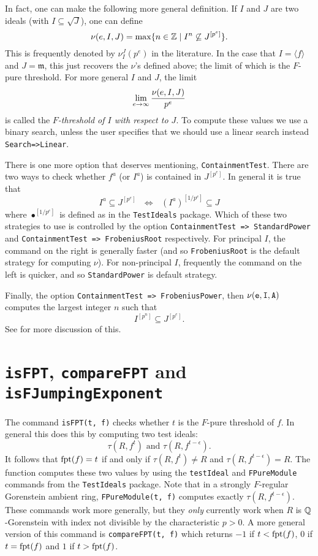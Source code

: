 \documentclass{amsart}
\newcommand{\fram}{\mathfrak{m}}
\begin{document}
In fact, one can make the following more general definition.  If $I$ and $J$ are two ideals (with $I \subseteq \sqrt{J}$), one can define
\[
\nu(e, I, J) = \max \{ n \in \mathbb{Z} \; |\; I^n \not\subseteq J^{[p^e]} \}.
\]
This is frequently denoted by $\nu_I^J(p^e)$ in the literature.  In the case that $I = \langle f \rangle$ and $J = \fram$, this just recovers the $\nu$'s defined above; the limit of which is the $F$-pure threshold.  For more general $I$ and $J$, the limit
\[
\lim_{e \to \infty} {\nu(e, I, J) \over p^e}
\]
is called the \emph{$F$-threshold of $I$ with respect to $J$}.  To compute these values we use a binary search, unless the user specifies that we should use a linear search instead {\tt Search=>Linear}.  

There is one more option that deserves mentioning, {\tt ContainmentTest}.  There are two ways to check whether $f^a$ (or $I^a$) is contained in $J^{[p^e]}$.  In general it is true that
\[
I^a \subseteq J^{[p^e]} \text{ $\Leftrightarrow$ } (I^a)^{[1/p^e]} \subseteq J
\]
where $\bullet^{[1/p^e]}$ is defined as in the {\tt TestIdeals} package.  Which of these two strategies to use is controlled by the option {\tt ContainmentTest => StandardPower} and {\tt ContainmentTest => FrobeniusRoot} respectively.
For principal $I$, the command on the right is generally faster (and so {\tt FrobeniusRoot} is the default strategy for computing $\nu$).  For non-principal $I$, frequently the command on the left is quicker, and so {\tt StandardPower} is default strategy. 

Finally, the option {\tt ContainmentTest => FrobeniusPower}, then ${\tt \nu(e, I, A)}$ computes the largest integer $n$ such that
\[
I^{[p^n]} \subseteq J^{[p^e]}.
\]
See \cite{HernandezTeixeiraWittFrobeniusPowers} for more discussion of this.  

\section{{\tt isFPT}, {\tt compareFPT} and {\tt isFJumpingExponent}}
\label{sec.IsFPT}

The command {\tt isFPT(t, f)} checks whether $t$ is the $F$-pure threshold of $f$.  In general this does this by computing two test ideals:
\[
\tau(R, f^t) \text{ and } \tau(R, f^{t-\epsilon}).
\]
It follows that $\operatorname{{fpt}}(f) = t$ if and only if $\tau(R, f^t) \neq R$ and $\tau(R, f^{t-\epsilon}) = R$.  The function computes these two values by using the {\tt testIdeal} and {\tt FPureModule} commands from the {\tt TestIdeals} package.  Note that in a strongly $F$-regular Gorenstein ambient ring, {\tt FPureModule(t, f)} computes exactly $\tau(R, f^{t-\epsilon})$.  These commands work more generally, but they \emph{only} currently work when $R$ is $\mathbb{Q}$-Gorenstein with index not divisible by the characteristic $p > 0$.  A more general version of this command is {\tt compareFPT(t, f)} which returns $-1$ if $t < \operatorname{{fpt}}(f)$, $0$ if $t = \operatorname{{fpt}}(f)$ and $1$ if $t > \operatorname{{fpt}}(f)$.  
\end{document}
